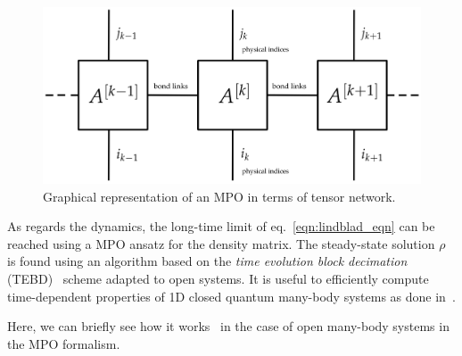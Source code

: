 \begin{figure}[H]
    \centering
    \includegraphics[scale=0.4]{Figures/mpo_graphical.png}
    \captionsetup{width=1.\linewidth}
    \caption{Graphical representation of an MPO in terms of tensor network.}
    \label{fig:mpo_graphical}
\end{figure}

As regards the dynamics, the long-time limit of eq.~\ref{eqn:lindblad_eqn} can be reached using a MPO ansatz for the density matrix. The steady-state solution $\rho$ is found using an algorithm based on the \emph{time evolution block decimation} (TEBD)~\cite{PhysRevLett.91.147902} scheme adapted to open systems. It is useful to efficiently compute time-dependent properties of 1D closed quantum many-body systems as done in~\cite{PhysRevLett.93.040502}. 

Here, we can briefly see how it works~\cite{jin_biella_ross} in the case of open many-body systems in the MPO formalism. 

